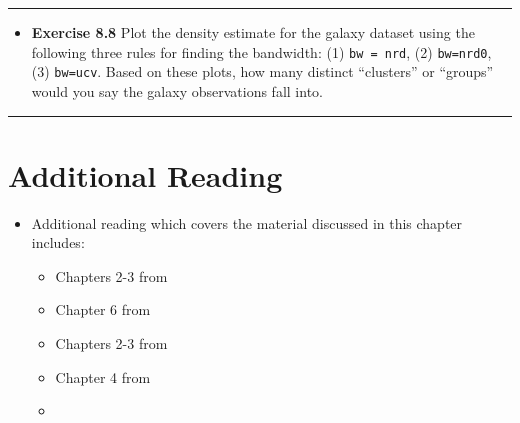 \documentclass[]{book}
\providecommand{\tightlist}{%
  \setlength{\itemsep}{0pt}\setlength{\parskip}{0pt}}
\begin{document}
\begin{center}\rule{0.5\linewidth}{\linethickness}\end{center}

\begin{itemize}
\tightlist
\item
  \textbf{Exercise 8.8} Plot the density estimate for the galaxy dataset using the following
  three rules for finding the bandwidth: (1) \texttt{bw\ =\ nrd}, (2) \texttt{bw=nrd0}, (3) \texttt{bw=ucv}.
  Based on these plots, how many distinct ``clusters'' or ``groups'' would you say
  the galaxy observations fall into.
\end{itemize}

\begin{center}\rule{0.5\linewidth}{\linethickness}\end{center}

\hypertarget{additional-reading-3}{%
\section{Additional Reading}\label{additional-reading-3}}

\begin{itemize}
\tightlist
\item
  Additional reading which covers the material discussed in this chapter includes:

  \begin{itemize}
  \tightlist
  \item
    Chapters 2-3 from \citet{silverman2018}
  \item
    Chapter 6 from \citet{wasserman2006}
  \item
    Chapters 2-3 from \citet{hardle2012}
  \item
    Chapter 4 from \citet{izenman2008}
  \item
    \citet{sheather2004}
  \end{itemize}
\end{itemize}


\end{document}
